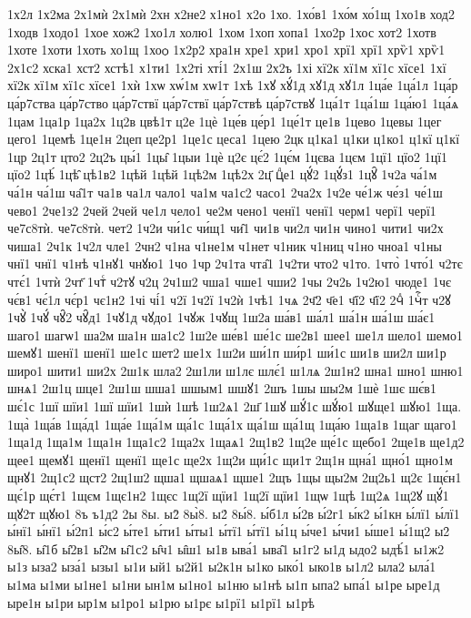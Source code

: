 {1х2л
1х2ма
2х1мѝ
2х1мѝ
2хн
х2не2
х1но1
х2о
1хо.
1хо́в1
1хо́м
хо́1щ
1хо1в
ход2
1ходв
1ходо1
1хое
хож2
1хо1л
холю1
1хом
1хоп
хопа1
1хо2р
1хос
хот2
1хотв
1хоте
1хоти
1хоть
хо1щ
1хоѻ
1х2р2
хра1н
хре1
хри1
хро1
хрї1
хрї1
хрѷ1
хрѷ1
2х1с2
хска1
хст2
хстѣ1
х1ти1
1х2ті
хті́1
2х1ш
2х2ъ
1хі
хї2к
хї1м
хї1с
хїсе1
1хї
хї2к
хї1м
хї1с
хїсе1
1хѝ
1хѡ
хѡ́1м
хѡ1т
1хѣ
1хꙋ
хꙋ́1д
хꙋ1д
хꙋ1л
1ца́е
1ца́1л
1ца́р
ца́р7ства
ца́р7ство
ца́р7ствї
ца́р7ствї
ца́р7ствѣ
ца́р7ствꙋ
1ца́1т
1ца́1ш
1ца́ю1
1ца́ѧ
1цам
1ца1р
1ца2х
1ц2в
цвѣ1т
ц2е
1цѐ
1це́в
це́р1
1це́1т
це1в
1цево
1цевы
1цег
цего1
1цемѣ
1це1н
2цеп
це2р1
1це1с
цеса1
1цею
2цк
ц1ка1
ц1ки
ц1ко1
ц1кї
ц1кї
1цр
2ц1т
цто2
2ц2ъ
цы́1
1цы̑
1цыи
1цѐ
ц2є
цє́2
1цє́м
1цєва
1цєм
1цї1
цїо2
1цї1
цїо2
1цѣ́
1цѣ̑
цѣ1в2
1цѣй
1цѣй
1цѣ2м
1цѣ2х
2ц҃
цⷣе1
цꙋ́2
1цꙋ́з1
1цꙋ̑
1ч2а
ча́1м
ча́1н
ча́1ш
ча̑1т
ча1в
ча1л
чало1
ча1м
ча1с2
часо1
2ча2х
1ч2е
че́1ж
че́з1
че́1ш
чево1
2че1з2
2чей
2чей
че1л
чело1
че2м
чено1
ченї1
ченї1
черм1
черї1
черї1
че7с8тѝ.
че7с8тѝ.
чет2
1ч2и
чи́1с
чи́щ1
чи̑1
чи1в
чи2л
чи1н
чино1
чити1
чи2х
чиша1
2ч1к
1ч2л
чле1
2чн2
ч1на
ч1не1м
ч1нет
ч1ник
ч1ниц
ч1но
чноа1
ч1ны
чнї1
чнї1
ч1нѣ
ч1нꙋ1
чнꙋю1
1чо
1чр
2ч1та
чта̑1
1ч2ти
что2
ч1то.
1что̀
1что́1
ч2тє
чтє́1
1чтѝ
2чт҃
1чтⷭ
ч2тꙋ
ч2ц
2ч1ш2
чша1
чше1
чши2
1чы
2ч2ь
1ч2ю1
чюде1
1чє
чє́в1
чє́1л
чє́р1
чє1н2
1чі
чі́1
ч2ї
1ч2ї
1ч2ѝ
1чѣ1
1чѧ
2ч҃2
ч҃е1
ч҃ї2
ч҃ї2
2чⷣ
1чⷭ҇т
ч2ꙋ
1чꙋ̀
1чꙋ́
чꙋ̑2
чꙋ̑д1
1чꙋ1д
чꙋдо1
1чꙋж
1чꙋщ
1ш2а
ша́в1
ша́л1
ша́1н
ша́1ш
ша́є1
шаго1
шагѡ1
ша2м
ша1н
ша1с2
1ш2е
ше́в1
ше́1с
ше2в1
шее1
ше1л
шело1
шемо1
шемꙋ1
шенї1
шенї1
ше1с
шет2
ше1х
1ш2и
ши́1п
ши́р1
ши́1с
ши1в
ши2л
ши1р
широ1
шити1
ши2х
2ш1к
шла2
2ш1ли
ш1лє
шлє́1
ш1лѧ
2ш1н2
шна1
шно1
шню1
шнѧ1
2ш1ц
шце1
2ш1ш
шша1
шшым1
шшꙋ1
2шъ
1шы
шы2м
1шѐ
1шє
шє́в1
шє́1с
1шї
шїи1
1шї
шїи1
1шѝ
1шѣ
1ш2ѧ1
2ш҃
1шꙋ
шꙋ́1с
шꙋ́ю1
шꙋще1
шꙋю1
1ща.
1ща̀
1ща́в
1ща́д1
1ща́е
1ща́1м
ща́1с
1ща́1х
ща́1ш
ща́1щ
1ща́ю
1ща1в
1щаг
щаго1
1ща1д
1ща1м
1ща1н
1ща1с2
1ща2х
1щаѧ1
2щ1в2
1щ2е
ще́1с
щебо1
2ще1в
ще1д2
щее1
щемꙋ1
щенї1
щенї1
ще1с
ще2х
1щ2и
щи́1с
щи1т
2щ1н
щна́1
щно́1
щно1м
щнꙋ1
2щ1с2
щст2
2щ1ш2
щша1
щшаѧ1
щше1
2щъ
1щы
щы2м
2щ2ь1
щ2є
1щє́н1
щє́1р
щє́т1
1щєм
1щє1н2
1щєс
1щ2ї
щїи1
1щ2ї
щїи1
1щѡ
1щѣ
1щ2ѧ
1щ2ꙋ
щꙋ́1
щꙋ2т
щꙋю1
8ъ
ъ1д2
2ы
8ы.
ы2̀
8ы̀8.
ы2́
8ы́8.
ы́б1л
ы́2в
ы́2г1
ы́к2
ы́1кн
ы́лї1
ы́лї1
ы́нї1
ы́нї1
ы́2п1
ы́с2
ы́те1
ы́ти1
ы́ты1
ы́тї1
ы́тї1
ы́1ц
ы́че1
ы́чи1
ы́ше1
ы́1щ2
ы2̑
8ы̑8.
ы̑1б
ы̑2в1
ы̑2м
ы̑1с2
ы̑ч1
ы̑ш1
ы1в
ыва́1
ыва̑1
ы1г2
ы1д
ыдо2
ыдѣ́1
ы1ж2
ы1з
ыза2
ыза́1
ызы1
ы1и
ый1
ы2й1
ы2к1н
ы1ко
ыко́1
ыко1в
ы1л2
ыла2
ыла́1
ы1ма
ы1ми
ы1не1
ы1ни
ын1м
ы1но1
ы1ню
ы1нѣ
ы1п
ыпа2
ыпа́1
ы1ре
ыре1д
ыре1н
ы1ри
ыр1м
ы1ро1
ы1рю
ы1рє
ы1рї1
ы1рї1
ы1рѣ
}

